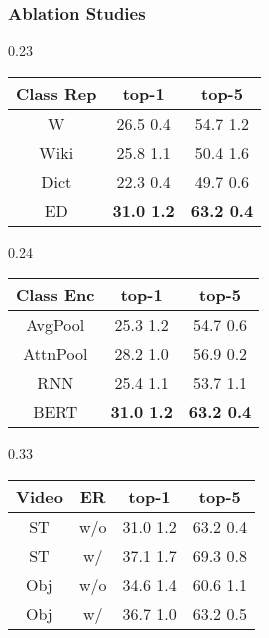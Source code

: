 \subsubsection{Ablation Studies}
\begin{table*}[ht]
    \small
    \begin{subtable}[h]{0.23\linewidth}
        \centering
        \begin{tabular}{c|cc} \toprule
        Class Rep & top-1 & top-5 \\ \midrule
        W & 26.5  0.4 & 54.7  1.2 \\
        Wiki & 25.8  1.1 & 50.4  1.6 \\
        Dict & 22.3  0.4 & 49.7  0.6 \\
        ED & \textbf{31.0  1.2}  & \textbf{63.2  0.4} \\ \bottomrule
       \end{tabular}
       \caption{Comparing action class texts.}
       \label{tab:action_class_text_ablation}
    \end{subtable}
    \hfill
    \begin{subtable}[h]{0.24\linewidth}
        \centering
        \begin{tabular}{c|cc} \toprule
        Class Enc & top-1 & top-5 \\ \midrule
        AvgPool & 25.3  1.2 & 54.7  0.6 \\
        AttnPool & 28.2  1.0 & 56.9  0.2 \\
        RNN & 25.4  1.1 & 53.7  1.1 \\
        BERT & \textbf{31.0  1.2} & \textbf{63.2  0.4} \\ \bottomrule
        \end{tabular}
        \caption{Comparing action class encoders.}
        \label{tab:action_class_encoder_ablation}
    \end{subtable}
    \hfill
    \begin{subtable}[h]{0.33\linewidth}
        \centering
        \begin{tabular}{cc|cc} \toprule
        Video & ER & top-1 & top-5 \\ \midrule
        ST & w/o & 31.0  1.2 & 63.2  0.4 \\
        ST & w/ & 37.1  1.7 & 69.3  0.8 \\
        Obj & w/o & 34.6  1.4 & 60.6  1.1 \\
        Obj & w/ & 36.7  1.0 & 63.2  0.5 \\ \bottomrule
        \end{tabular}

\end{subtable}
\end{table*}
